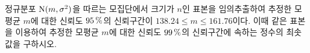 정규분포 $\mathrm{N}(m{,}\mkern3mu\mathopen{}\sigma^2)$을 따르는 모집단에서 크기가 $n$인 표본을 임의추출하여 추정한 모평균 $m$에 대한 신뢰도 $95\mkern3mu \%$의 신뢰구간이 $138.24\le m\le 161.76$이다. 이때 같은 표본을 이용하여 추정한 모평균 $m$에 대한 신뢰도 $99\mkern3mu \%$의 신뢰구간에 속하는 정수의 최솟값을 구하시오. 
